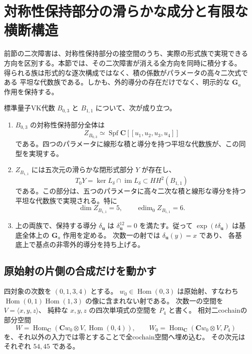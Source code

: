 \section{対称性保持部分の滑らかな成分と有限な横断構造}
\label{sec:vk-symmetry-families-v38}

前節の二次障害は、対称性保持部分の接空間のうち、実際の形式族で実現できる
方向を区別する。本節では、その二次障害が消える全方向を同時に積分する。
得られる族は形式的な逐次構成ではなく、積の係数がパラメータの高々二次式である
平坦な代数族である。しかも、外的導分の存在だけでなく、明示的な
$\mathbf G_a$ 作用を保持する。

\begin{theorem}[対称性を保持する全次数の族]
\label{thm:vk-Ga-families-v38}
標準量子VK代数 $B_{0,3}$ と $B_{1,1}$ について、次が成り立つ。
\begin{enumerate}
\item $B_{0,3}$ の対称性保持部分全体は
\[
 Z_{B_{0,3}}\simeq\operatorname{Spf}\mathbf C[[u_1,u_2,u_3,u_4]]
\]
である。四つのパラメータに線形な積と導分を持つ平坦な代数族が、この同型を実現する。
\item $Z_{B_{1,1}}$ には五次元の滑らかな閉形式部分 $Y$ が存在し、
\[
 T_0Y=\ker L_\delta\cap\operatorname{im}L_\delta
       \subset HH^2(B_{1,1})
\]
である。この部分は、五つのパラメータに高々二次な積と線形な導分を持つ
平坦な代数族で実現される。特に
\[
 \dim Z_{B_{1,1}}=5,\qquad
 \operatorname{edim}_0 Z_{B_{1,1}}=6.
\]
\item 上の両族で、保持する導分 $\delta_{\boldsymbol u}$ は
$\delta_{\boldsymbol u}^{12}=0$ を満たす。従って
$\exp(t\delta_{\boldsymbol u})$ は基底全体上の $\mathbf G_a$ 作用を定める。
次数一の射では $\delta_{\boldsymbol u}(y)=x$ であり、
各基底上で基点の非零外的導分を持ち上げる。
\end{enumerate}
\end{theorem}

\subsection{原始射の片側の合成だけを動かす}

四対象の次数を $(0,1,3,4)$ とする。
$w_0\in\operatorname{Hom}(0,3)$ は原始射、すなわち
$\operatorname{Hom}(0,1)\operatorname{Hom}(1,3)$ の像に含まれない射である。
次数一の空間を $V=\langle x,y,z\rangle$、
純粋な $x,y,z$ の四次単項式の空間を $P_4$ と書く。
相対二cochainの部分空間
\[
 W=\operatorname{Hom}_{\mathbf C}(\mathbf C w_0\otimes V,
             \operatorname{Hom}(0,4)),\qquad
 W_0=\operatorname{Hom}_{\mathbf C}(\mathbf C w_0\otimes V,P_4)
\]
を、それ以外の入力では零とすることで全cochain空間へ埋め込む。
その次元はそれぞれ $54,45$ である。


